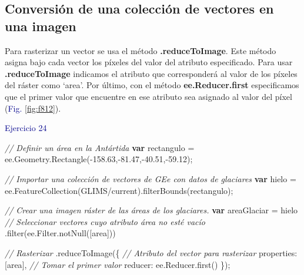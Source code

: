 \documentclass[
  12pt,
  letterpaper,
  twoside]{book}
\newenvironment{Shaded}{\begin{snugshade}}{\end{snugshade}}
\newcommand{\AttributeTok}[1]{\textcolor[rgb]{0.48,0.12,0.64}{#1}}
\newcommand{\CommentTok}[1]{\textcolor[rgb]{0.24,0.58,0.00}{\textit{#1}}}
\newcommand{\DataTypeTok}[1]{\textcolor[rgb]{0.00,0.00,0.00}{#1}}
\newcommand{\FloatTok}[1]{\textcolor[rgb]{0.28,0.53,0.93}{#1}}
\newcommand{\FunctionTok}[1]{\textcolor[rgb]{0.48,0.12,0.64}{#1}}
\newcommand{\KeywordTok}[1]{\textcolor[rgb]{0.00,0.00,0.00}{\textbf{#1}}}
\newcommand{\NormalTok}[1]{#1}
\newcommand{\OperatorTok}[1]{\textcolor[rgb]{0.00,0.00,0.00}{#1}}
\newcommand{\StringTok}[1]{\textcolor[rgb]{0.87,0.29,0.22}{#1}}
\newcommand\boldpurple[1]{\textcolor{darkpurple}{\textbf{#1}}}
\begin{document}
\hypertarget{conversiuxf3n-de-una-colecciuxf3n-de-vectores-en-una-imagen}{%
\subsection*{Conversión de una colección de vectores en una imagen}\label{conversiuxf3n-de-una-colecciuxf3n-de-vectores-en-una-imagen}}

Para rasterizar un vector se usa el método \boldpurple{.reduceToImage}. Este método asigna bajo cada vector los píxeles del valor del atributo especificado. Para usar \boldpurple{.reduceToImage} indicamos el atributo que corresponderá al valor de los píxeles del ráster como `area'. Por último, con el método \boldpurple{ee.Reducer.first} especificamos que el primer valor que encuentre en ese atributo sea asignado al valor del píxel (\textcolor{darkblue}{Fig.} \ref{fig:f812}).

\textcolor{darkblue}{Ejercicio 24}

\begin{Shaded}
\begin{Highlighting}[]
\CommentTok{// Definir un área en la Antártida}
\KeywordTok{var}\NormalTok{ rectangulo }\OperatorTok{=}\NormalTok{ ee}\OperatorTok{.}\AttributeTok{Geometry}\OperatorTok{.}\FunctionTok{Rectangle}\NormalTok{(}\OperatorTok{{-}}\FloatTok{158.63}\OperatorTok{,{-}}\FloatTok{81.47}\OperatorTok{,{-}}\FloatTok{40.51}\OperatorTok{,{-}}\FloatTok{59.12}\NormalTok{)}\OperatorTok{;}

\CommentTok{// Importar una colección de vectores de GEe con datos de glaciares}
\KeywordTok{var}\NormalTok{ hielo }\OperatorTok{=}\NormalTok{ ee}\OperatorTok{.}\FunctionTok{FeatureCollection}\NormalTok{(}\StringTok{\textquotesingle{}GLIMS/current\textquotesingle{}}\NormalTok{)}\OperatorTok{.}\FunctionTok{filterBounds}\NormalTok{(rectangulo)}\OperatorTok{;}

\CommentTok{// Crear una imagen ráster de las áreas de los glaciares.}
\KeywordTok{var}\NormalTok{ areaGlaciar }\OperatorTok{=}\NormalTok{ hielo}
\CommentTok{// Seleccionar vectores cuyo atributo área no esté vacío}
    \OperatorTok{.}\FunctionTok{filter}\NormalTok{(ee}\OperatorTok{.}\AttributeTok{Filter}\OperatorTok{.}\FunctionTok{notNull}\NormalTok{([}\StringTok{\textquotesingle{}area\textquotesingle{}}\NormalTok{])) }
    
\CommentTok{// Rasterizar  }
\OperatorTok{.}\FunctionTok{reduceToImage}\NormalTok{(\{}
    \CommentTok{// Atributo del vector para rasterizar}
    \DataTypeTok{properties}\OperatorTok{:}\NormalTok{ [}\StringTok{\textquotesingle{}area\textquotesingle{}}\NormalTok{]}\OperatorTok{,} 
    \CommentTok{// Tomar el primer valor}
    \DataTypeTok{reducer}\OperatorTok{:}\NormalTok{ ee}\OperatorTok{.}\AttributeTok{Reducer}\OperatorTok{.}\FunctionTok{first}\NormalTok{()  }
\NormalTok{    \})}\OperatorTok{;}
\end{Highlighting}
\end{Shaded}
\end{document}

